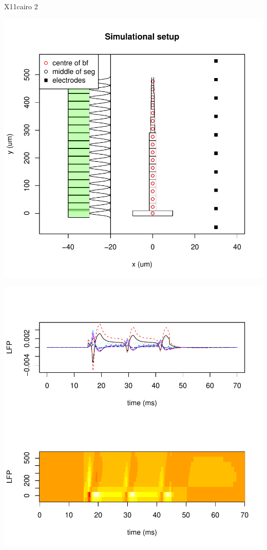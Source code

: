 \documentclass[10pt,a4paper]{report}
\begin{document}
\begin{Schunk}
\begin{Soutput}
X11cairo 
       2 
\end{Soutput}
\end{Schunk}
\includegraphics{bs_1D_130506-setup}

\includegraphics{bs_1D_130506-elefpes}
\end{document}
